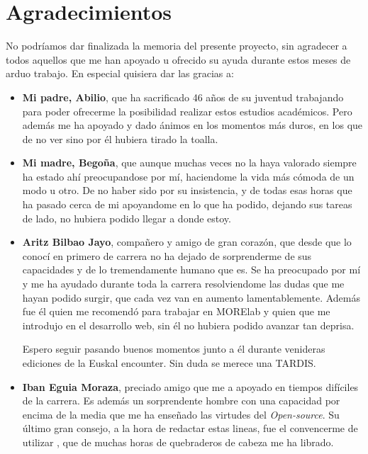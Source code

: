 \chapter*{Agradecimientos}

No podríamos dar finalizada la memoria del presente proyecto, sin agradecer a todos aquellos que me han apoyado u ofrecido su ayuda durante estos meses de arduo trabajo.
En especial quisiera dar las gracias a: 

\begin{itemize}
	\item \textbf{Mi padre, Abilio}, que ha sacrificado 46 años de su juventud trabajando para poder ofrecerme la posibilidad realizar estos estudios académicos. Pero además me ha apoyado y dado ánimos en los momentos más duros, en los que de no ver sino por él hubiera tirado la toalla.

	\item \textbf{Mi madre, Begoña}, que aunque muchas veces no la haya valorado siempre ha estado ahí preocupandose por mí, haciendome la vida más cómoda de un modo u otro. De no haber sido por su insistencia, y de todas esas horas que ha pasado cerca de mi apoyandome en lo que ha podido, dejando sus tareas de lado, no hubiera podido llegar a donde estoy.

	\item \textbf{Aritz Bilbao Jayo}, compañero y amigo de gran corazón, que desde que lo conocí en primero de carrera no ha dejado de sorprenderme de sus capacidades y de lo tremendamente humano que es. Se ha preocupado por mí y me ha ayudado durante toda la carrera resolviendome las dudas que me hayan podido surgir, que cada vez van en aumento lamentablemente. 
	Además fue él quien me recomendó para trabajar en MORElab y quien que me introdujo en el desarrollo web, sin él no hubiera podido avanzar tan deprisa.
	
	Espero seguir pasando buenos momentos junto a él durante venideras ediciones de la Euskal encounter. Sin duda se merece una TARDIS.

	\item \textbf{Iban Eguia Moraza}, preciado amigo que me a apoyado en tiempos difíciles de la carrera. Es además un sorprendente hombre con una capacidad por encima de la media que me ha enseñado las virtudes del \textit{Open-source}. Su último gran consejo, a la hora de redactar estas lineas, fue el convencerme de utilizar , que de muchas horas de quebraderos de cabeza me ha librado.
	

\end{itemize}
